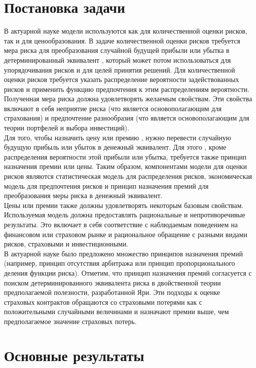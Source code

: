 \documentclass[12pt,a4paper]{article}
\begin{document}
\section{ Постановка задачи}
В актуарной науке модели используются как для количественной оценки рисков, так и для ценообразования. 
В задаче количественной оценки рисков требуется мера риска для преобразования случайной будущей прибыли или убытка  в  детерминированный
эквивалент , который может потом  использоваться для упорядочивания рисков и для целей принятия решений. Для количественной оценки рисков требуется указать распределение вероятности задействованных рисков и  применить функцию предпочтения к этим распределениям вероятности.   Полученная мера риска должна удовлетворять желаемым свойствам. Эти свойства включают в себя неприятие риска (что является основополагающим для страхования) и предпочтение разнообразия (что  является основополагающим для теории портфелей и выбора инвестиций). \\
Для того, чтобы назначить цену или премию , нужно перевести случайную будущую прибыль или убыток  в денежный эквивалент. Для этого ,  кроме распределения вероятности этой прибыли или убытка, требуется также принцип назначения премии или цены.  Таким образом, компонентами модели для оценки рисков являются статистическая модель для распределения рисков, экономическая модель для предпочтения рисков и принцип назначения премий для преобразования меры риска в денежный эквивалент.\\
Цены или премии  также должны удовлетворять некоторым базовым свойствам. Используемая модель должна предоставлять рациональные и  непротиворечивые   результаты. Это включает в себя соответствие с наблюдаемым поведением  на финансовом или страховом рынке и рациональное обращение с разными видами рисков, страховыми и инвестиционными. \\
В актуарной науке было предложено множество принципов назначения премий (например, принцип отсутствия арбитража или принцип пропорционального деления функции риска).   Отметим, что принцип назначения премий согласуется с поиском детерминированного эквивалента риска в двойственной теории предполагаемой полезности, разработанной Яри. Эти подходы к оценке страховых контрактов обращаются со  страховыми потерями как с положительными случайными величинами и назначают премии выше, чем предполагаемое значение страховых потерь.

\section {Основные результаты}
\end{document}
